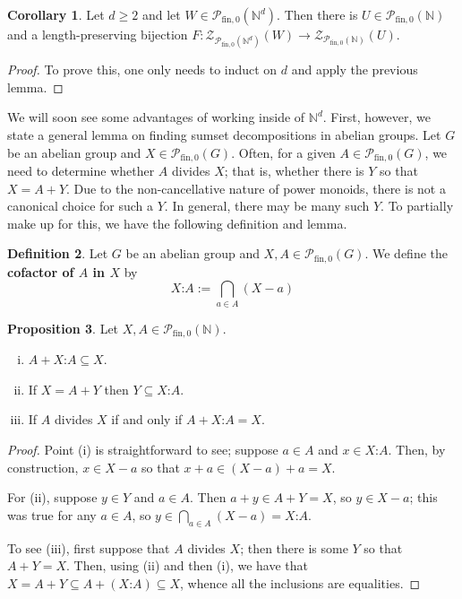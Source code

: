 \documentclass{report}
\newcommand{\NN}{\mathbb{N}}
\renewcommand{\P}{\mathcal{P}}
\newcommand{\Z}{\mathcal{Z}}
\newcommand{\fin}{\textrm{fin}}
\newcommand{\fon}{{\textrm{fin}, 0}}
\renewcommand{\:}{\text{:}}
\newcommand{\PN}{{\P_{\fin,0}(\NN)}}
\theoremstyle{definition}
\newtheorem{defn}{Definition}[section]
\newtheorem{prop}[defn]{Proposition}
\newtheorem{cor}[defn]{Corollary}
\begin{document}
\begin{cor} \label{cor:passage to Nd}
Let $d\ge 2$ and let $W\in \P_\fon(\NN^d)$.
Then there is $U\in \PN$ and a length-preserving bijection $F:\Z_{\P_\fon(\NN^d)}(W) \to \Z_{\PN}(U)$.
\end{cor}
\begin{proof}
	To prove this, one only needs to induct on $d$ and apply the previous lemma.
\end{proof}

We will soon see some advantages of working inside of $\NN^d$.
First, however, we state a general lemma on finding sumset decompositions in abelian groups.
Let $G$ be an abelian group and $X\in \P_\fon(G)$.
Often, for a given $A\in \P_\fon(G)$, we need to determine whether $A$ divides $X$; that is, whether there is $Y$ so that $X = A+Y$.
Due to the non-cancellative nature of power monoids, there is not a canonical choice for such a $Y$.
In general, there may be many such $Y$.
To partially make up for this, we have the following definition and lemma.

\begin{defn} \label{def:cofactor}
	Let $G$ be an abelian group and $X,A\in \P_{\fin,0}(G)$.
	We define the \textbf{cofactor of $A$ in $X$} by
	\[ X\:A := \bigcap_{a\in A} (X-a) \]
\end{defn}

\begin{prop} \label{prop:cofactors}
	Let $X,A \in \PN$. 
	\begin{enumerate}[(i)]
		\item $A + X\:A \subseteq X$.
		\item If $X = A + Y$ then $Y \subseteq X\:A$.
		\item If $A$ divides $X$ if and only if $A + X\:A = X$.
	\end{enumerate}
\end{prop}

\begin{proof}
	Point (i) is straightforward to see; suppose $a\in A$ and $x\in X\:A$.
	Then, by construction, $x\in X-a$ so that $x+a \in (X-a) +a = X$.
	
	For (ii), suppose $y\in Y$ and $a\in A$.
	Then $a+y \in A + Y = X$, so $y \in X-a$; this was true for any $a\in A$, so $y\in \bigcap_{a\in A} (X-a) = X\:A$.
	
	To see (iii), first suppose that $A$ divides $X$; then there is some $Y$ so that $A + Y = X$.
	Then, using (ii) and then (i), we have that $X = A+Y \subseteq A+ (X\:A) \subseteq X$, whence all the inclusions are equalities.
\end{proof}
\end{document}
